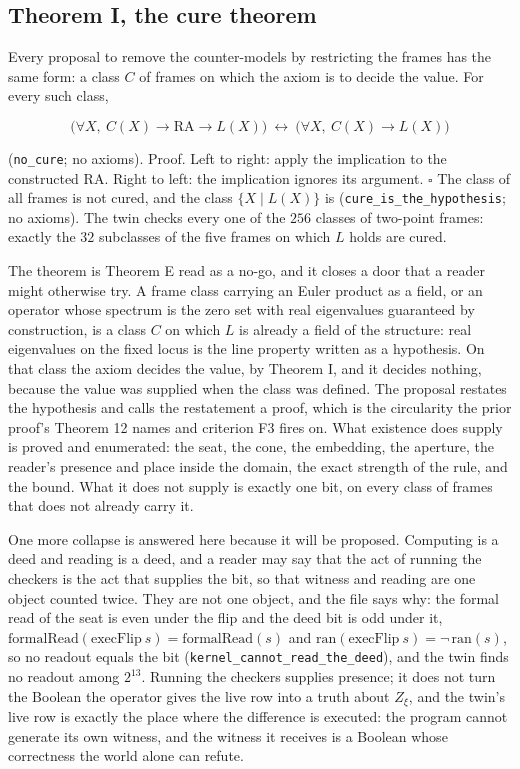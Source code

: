 \documentclass[10pt,twocolumn]{article}
\begin{document}
\hypertarget{theorem-i-the-cure-theorem}{%
\subsection{Theorem I, the cure
theorem}\label{theorem-i-the-cure-theorem}}

Every proposal to remove the counter-models by restricting the frames
has the same form: a class \(C\) of frames on which the axiom is to
decide the value. For every such class,

\[\big(\forall X,\ C(X) \to \mathrm{RA} \to L(X)\big) \ \leftrightarrow\ \big(\forall X,\ C(X) \to L(X)\big)\]

(\texttt{no\_\allowbreak cure}; no axioms). Proof. Left to right: apply
the implication to the constructed \(\mathrm{RA}\). Right to left: the
implication ignores its argument. \(\square\) The class of all frames is
not cured, and the class \(\{X \mid L(X)\}\) is
(\texttt{cure\_\allowbreak is\_\allowbreak the\_\allowbreak hypothesis};
no axioms). The twin checks every one of the \(256\) classes of
two-point frames: exactly the \(32\) subclasses of the five frames on
which \(L\) holds are cured.

The theorem is Theorem E read as a no-go, and it closes a door that a
reader might otherwise try. A frame class carrying an Euler product as a
field, or an operator whose spectrum is the zero set with real
eigenvalues guaranteed by construction, is a class \(C\) on which \(L\)
is already a field of the structure: real eigenvalues on the fixed locus
is the line property written as a hypothesis. On that class the axiom
decides the value, by Theorem I, and it decides nothing, because the
value was supplied when the class was defined. The proposal restates the
hypothesis and calls the restatement a proof, which is the circularity
the prior proof's Theorem 12 names and criterion F3 fires on. What
existence does supply is proved and enumerated: the seat, the cone, the
embedding, the aperture, the reader's presence and place inside the
domain, the exact strength of the rule, and the bound. What it does not
supply is exactly one bit, on every class of frames that does not
already carry it.

One more collapse is answered here because it will be proposed.
Computing is a deed and reading is a deed, and a reader may say that the
act of running the checkers is the act that supplies the bit, so that
witness and reading are one object counted twice. They are not one
object, and the file says why: the formal read of the seat is even under
the flip and the deed bit is odd under it,
\(\mathrm{formalRead}(\mathrm{execFlip}\ s) = \mathrm{formalRead}(s)\)
and \(\mathrm{ran}(\mathrm{execFlip}\ s) = \neg\,\mathrm{ran}(s)\), so
no readout equals the bit
(\texttt{kernel\_\allowbreak cannot\_\allowbreak read\_\allowbreak the\_\allowbreak deed}),
and the twin finds no readout among \(2^{13}\). Running the checkers
supplies presence; it does not turn the Boolean the operator gives the
live row into a truth about \(Z_\xi\), and the twin's live row is
exactly the place where the difference is executed: the program cannot
generate its own witness, and the witness it receives is a Boolean whose
correctness the world alone can refute.
\end{document}
